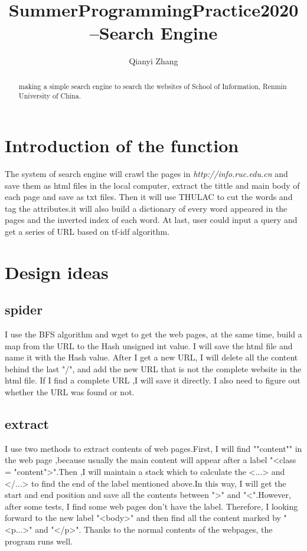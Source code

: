 \documentclass[a4paper]{article}
\title{SummerProgrammingPractice2020--Search Engine}
\author{Qianyi Zhang}
\begin{document}
\maketitle

\begin{abstract}
making a simple search engine to search the websites of School of Information, Renmin University of China.
\end{abstract}

\section{Introduction of the function}
The system of search engine will crawl the pages in  \emph{http://info.ruc.edu.cn} and save them as html files in the local computer, extract the tittle and main body of each page and save as txt files. Then it will use THULAC to cut the words and tag the attributes.it will also build a dictionary of every word appeared in the pages and the inverted index of each word. At last, user could input a query and get a series of URL based on tf-idf algorithm.
\section{Design ideas}

\subsection{spider}
I use the BFS algorithm and wget to get the web pages, at the same time, build a map from the URL to the Hash unsigned int value. I will save the html file and name it with the Hash value. After I get a new URL, I will delete all the content behind the last "/", and add the new URL that is not the complete website in the html file. If I find a complete URL ,I will save it directly. I also need to figure out whether the URL was found or not.  

\subsection{extract}
I use two methods to extract contents of web pages.First, I will find ""content"" in the web page ,because usually the main content will appear after a label "<class = "content">".Then ,I will maintain a stack which to calculate the <...> and </...> to find the end of the label mentioned above.In this way, I will get the start and end position and save all the contents between ">" and "<".However, after some tests, I find some web pages don't have the label. Therefore, I looking forward to the new label "<body>" and then find all the content marked by "<p...>" and "</p>". Thanks to the normal contents of the webpages, the program runs well. 
\end{document}

